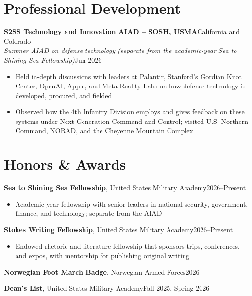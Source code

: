 \documentclass[10pt,letterpaper]{article}
\let\oldsection\section
\renewcommand{\section}{\needspace{7\baselineskip}\oldsection}
\newcommand{\entry}[4]{%
  \needspace{3\baselineskip}%
  \textbf{#1}\hfill #2\\
  \textit{#3}\hfill #4\par}
\newcommand{\single}[3]{%
  \needspace{3\baselineskip}%
  \textbf{#1}, #2\hfill #3\par}
\begin{document}
\section{Professional Development}
\entry{S2SS Technology and Innovation AIAD -- SOSH, USMA}{California and Colorado}{Summer AIAD on defense technology (separate from the academic-year Sea to Shining Sea Fellowship)}{Jun 2026}
\begin{itemize}
  \item Held in-depth discussions with leaders at Palantir, Stanford's Gordian Knot Center, OpenAI, Apple, and Meta Reality Labs on how defense technology is developed, procured, and fielded

  \item Observed how the 4th Infantry Division employs and gives feedback on these systems under Next Generation Command and Control; visited U.S. Northern Command, NORAD, and the Cheyenne Mountain Complex
\end{itemize}

\section{Honors \& Awards}
\single{Sea to Shining Sea Fellowship}{United States Military Academy}{2026--Present}
\begin{itemize}
  \item Academic-year fellowship with senior leaders in national security, government, finance, and technology; separate from the AIAD
\end{itemize}
\single{Stokes Writing Fellowship}{United States Military Academy}{2026--Present}
\begin{itemize}
  \item Endowed rhetoric and literature fellowship that sponsors trips, conferences, and expos, with mentorship for publishing original writing
\end{itemize}
\single{Norwegian Foot March Badge}{Norwegian Armed Forces}{2026}
\single{Dean's List}{United States Military Academy}{Fall 2025, Spring 2026}

\end{document}
